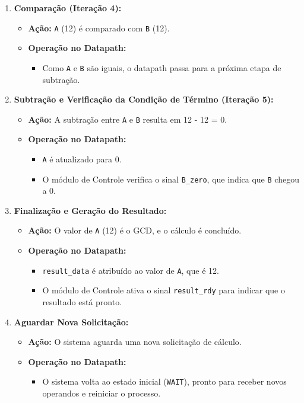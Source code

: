 \documentclass[a4paper,11pt]{article} %
\begin{document}
\begin{enumerate}
    \item \textbf{Comparação (Iteração 4):}
    \begin{itemize}
        \item \textbf{Ação:} \texttt{A} (12) é comparado com \texttt{B} (12).
        \item \textbf{Operação no Datapath:} 
        \begin{itemize}
            \item Como \texttt{A} e \texttt{B} são iguais, o datapath passa para a próxima etapa de subtração.
        \end{itemize}
    \end{itemize}

    \item \textbf{Subtração e Verificação da Condição de Término (Iteração 5):}
    \begin{itemize}
        \item \textbf{Ação:} A subtração entre \texttt{A} e \texttt{B} resulta em 12 - 12 = 0.
        \item \textbf{Operação no Datapath:} 
        \begin{itemize}
            \item \texttt{A} é atualizado para 0.
            \item O módulo de Controle verifica o sinal \texttt{B\_zero}, que indica que \texttt{B} chegou a 0.
        \end{itemize}
    \end{itemize}

    \item \textbf{Finalização e Geração do Resultado:}
    \begin{itemize}
        \item \textbf{Ação:} O valor de \texttt{A} (12) é o GCD, e o cálculo é concluído.
        \item \textbf{Operação no Datapath:} 
        \begin{itemize}
            \item \texttt{result\_data} é atribuído ao valor de \texttt{A}, que é 12.
            \item O módulo de Controle ativa o sinal \texttt{result\_rdy} para indicar que o resultado está pronto.
        \end{itemize}
    \end{itemize}

    \item \textbf{Aguardar Nova Solicitação:}
    \begin{itemize}
        \item \textbf{Ação:} O sistema aguarda uma nova solicitação de cálculo.
        \item \textbf{Operação no Datapath:} 
        \begin{itemize}
            \item O sistema volta ao estado inicial (\texttt{WAIT}), pronto para receber novos operandos e reiniciar o processo.
        \end{itemize}
    \end{itemize}
\end{enumerate}
\end{document}
